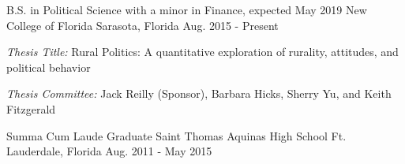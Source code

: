 

\begin{cventries}

  \cventry
    {B.S. in Political Science with a minor in Finance, expected May 2019} %
    {New College of Florida} %
    {Sarasota, Florida} %
    {Aug. 2015 - Present} %
    {
    \begin{cvitems}
      \item \emph{Thesis Title:} Rural Politics: A quantitative exploration of rurality, attitudes, and political behavior
      \item \emph{Thesis Committee:} Jack Reilly (Sponsor), Barbara Hicks, Sherry Yu, and Keith Fitzgerald
    \end{cvitems}
  }

  \cventry
    {Summa Cum Laude Graduate} %
    {Saint Thomas Aquinas High School} %
    {Ft. Lauderdale, Florida} %
    {Aug. 2011 - May 2015} %
    {}


\vspace{-.1cm}


\end{cventries}

